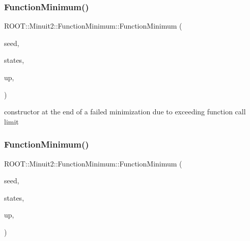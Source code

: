 \mbox{\label{classROOT_1_1Minuit2_1_1FunctionMinimum_aa68c6d1a70d47537fef4990cd797ebc0}} 
\subsubsection{\texorpdfstring{FunctionMinimum()}{FunctionMinimum()}\hspace{0.1cm}{\footnotesize\ttfamily [3/10]}}
{\footnotesize\ttfamily R\+O\+O\+T\+::\+Minuit2\+::\+Function\+Minimum\+::\+Function\+Minimum (\begin{DoxyParamCaption}\item[{const \mbox{\hyperlink{classROOT_1_1Minuit2_1_1MinimumSeed}{Minimum\+Seed}} \&}]{seed,  }\item[{const std\+::vector$<$ \mbox{\hyperlink{classROOT_1_1Minuit2_1_1MinimumState}{Minimum\+State}} $>$ \&}]{states,  }\item[{double}]{up,  }\item[{\mbox{\hyperlink{classROOT_1_1Minuit2_1_1FunctionMinimum_1_1MnReachedCallLimit}{Mn\+Reached\+Call\+Limit}}}]{ }\end{DoxyParamCaption})\hspace{0.3cm}{\ttfamily [inline]}}



constructor at the end of a failed minimization due to exceeding function call limit 

\mbox{\label{classROOT_1_1Minuit2_1_1FunctionMinimum_a70961c8a405bd4298247c9b353804154}} 
\subsubsection{\texorpdfstring{FunctionMinimum()}{FunctionMinimum()}\hspace{0.1cm}{\footnotesize\ttfamily [4/10]}}
{\footnotesize\ttfamily R\+O\+O\+T\+::\+Minuit2\+::\+Function\+Minimum\+::\+Function\+Minimum (\begin{DoxyParamCaption}\item[{const \mbox{\hyperlink{classROOT_1_1Minuit2_1_1MinimumSeed}{Minimum\+Seed}} \&}]{seed,  }\item[{const std\+::vector$<$ \mbox{\hyperlink{classROOT_1_1Minuit2_1_1MinimumState}{Minimum\+State}} $>$ \&}]{states,  }\item[{double}]{up,  }\item[{\mbox{\hyperlink{classROOT_1_1Minuit2_1_1FunctionMinimum_1_1MnAboveMaxEdm}{Mn\+Above\+Max\+Edm}}}]{ }\end{DoxyParamCaption})\hspace{0.3cm}{\ttfamily [inline]}}




